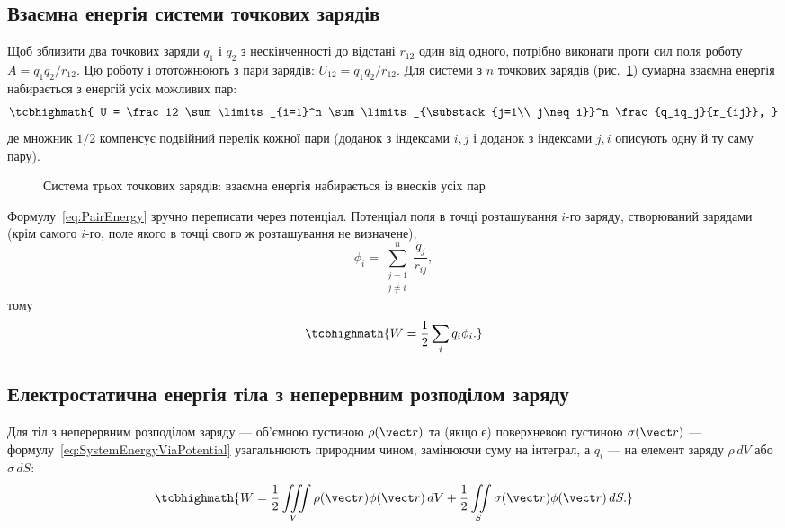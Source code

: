 \subsection*{Взаємна енергія системи точкових зарядів}

Щоб зблизити два точкових заряди $q_1$ і $q_2$ з нескінченності до відстані $r_{12}$ один від одного, потрібно виконати проти сил поля роботу
$A = q_1q_2/r_{12}$. Цю роботу і ототожнюють з  пари зарядів: $U_{12} = q_1q_2/r_{12}$. Для системи з $n$ точкових зарядів
(рис.~\ref{pic:ChargesTriangle}) сумарна взаємна енергія набирається з енергій усіх можливих пар:
\begin{equation}\label{eq:PairEnergy}
	\tcbhighmath{
		U = \frac12 \sum\limits_{i=1}^n \sum\limits_{\substack{j=1\\ j\neq i}}^n \frac{q_iq_j}{r_{ij}},
	}
\end{equation}
де множник $1/2$ компенсує подвійний перелік кожної пари (доданок з індексами $i,j$ і доданок з індексами $j,i$ описують одну й ту саму пару).

\begin{figure}\centering
	\caption{Система трьох точкових зарядів: взаємна енергія набирається із внесків усіх пар\label{pic:ChargesTriangle}}
\end{figure}

Формулу~\eqref{eq:PairEnergy} зручно переписати через потенціал. Потенціал поля в точці розташування $i$-го заряду, створюваний 
зарядами (крім самого $i$-го, поле якого в точці свого ж розташування не визначене),
\begin{equation*}
	\phi_i = \sum\limits_{\substack{j=1 \\ j \neq i}}^n \frac{q_j}{r_{ij}},
\end{equation*}
тому
\begin{equation}\label{eq:SystemEnergyViaPotential}
	\tcbhighmath{
		W = \frac12 \sum\limits_i q_i \phi_i.
	}
\end{equation}

\subsection*{Електростатична енергія тіла з неперервним розподілом заряду}

Для тіл з неперервним розподілом заряду --- об'ємною густиною $\rho(\vect r)$ та (якщо є) поверхневою густиною $\sigma(\vect r)$ ---
формулу~\eqref{eq:SystemEnergyViaPotential} узагальнюють природним чином, замінюючи суму на інтеграл, а $q_i$ --- на елемент заряду $\rho\, dV$ або
$\sigma\, dS$:
\begin{equation}\label{eq:BodyEnergy}
	\tcbhighmath{
		W = \frac12 \iiint\limits_V \rho(\vect r)\phi(\vect r)\, dV + \frac12 \iint\limits_S \sigma(\vect r)\phi(\vect r)\, dS.
	}
\end{equation}

